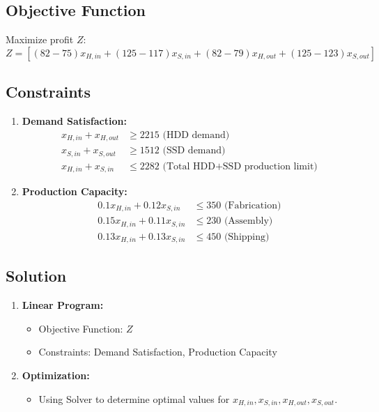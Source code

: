 \documentclass[12pt]{article}
\begin{document}
\subsection*{Objective Function}
Maximize profit \( Z \):
\[
Z = [(82 - 75)x_{H,in} + (125 - 117)x_{S,in} + (82 - 79)x_{H,out} + (125 - 123)x_{S,out}]
\]

\subsection*{Constraints}

\begin{enumerate}
    \item \textbf{Demand Satisfaction:}
    \begin{align*}
    x_{H,in} + x_{H,out} &\geq 2215 \text{ (HDD demand)} \\
    x_{S,in} + x_{S,out} &\geq 1512 \text{ (SSD demand)} \\
    x_{H,in} + x_{S,in} &\leq 2282 \text{ (Total HDD+SSD production limit)}
    \end{align*}
    
    \item \textbf{Production Capacity:}
    \begin{align*}
    0.1x_{H,in} + 0.12x_{S,in} &\leq 350 \text{ (Fabrication)} \\
    0.15x_{H,in} + 0.11x_{S,in} &\leq 230 \text{ (Assembly)} \\
    0.13x_{H,in} + 0.13x_{S,in} &\leq 450 \text{ (Shipping)}
    \end{align*}
\end{enumerate}

\subsection*{Solution }

\begin{enumerate}
    \item \textbf{Linear Program:}
    \begin{itemize}
        \item Objective Function: \( Z \)
        \item Constraints: Demand Satisfaction, Production Capacity
    \end{itemize}
    
    \item \textbf{Optimization:}
    \begin{itemize}
        \item Using Solver to determine  optimal values for \( x_{H,in}, x_{S,in}, x_{H,out}, x_{S,out} \).
    \end{itemize}
\end{enumerate}
\end{document}
